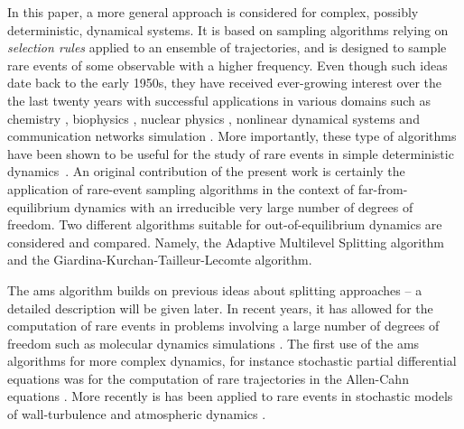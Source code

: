 \documentclass{jfm}
\begin{document}
%
In this paper, a more general approach is considered for complex, possibly deterministic, dynamical systems.
It is based on sampling algorithms relying on \emph{selection rules} applied to an ensemble of trajectories, and is designed to sample rare events of some observable with a higher frequency.
%    
%
Even though such ideas date back to the early 1950s, they have received ever-growing interest over the the last twenty years with successful applications in various domains such as chemistry \citep{van_erp_elaborating_2005,escobedo_transition_2009,teo_adaptive_2016}, biophysics \citep{huber_weighted-ensemble_1996,zuckerman2017weighted,bolhuis2005kinetic}, nuclear physics \citep{louvin2017}, nonlinear dynamical systems \citep{tailleur_probing_2007} and communication networks simulation \citep{villen-altamirano_restart:_1994}.
More importantly, these type of algorithms have been shown to be useful for the study of rare events in simple deterministic dynamics~\citep{wouters2016rare}.
%
%
An original contribution of the present work is certainly the application of rare-event sampling algorithms in the context of far-from-equilibrium dynamics with an irreducible very large number of degrees of freedom. 
% 
Two different algorithms suitable for out-of-equilibrium dynamics are considered and compared. Namely, the Adaptive Multilevel Splitting algorithm and the Giardina-Kurchan-Tailleur-Lecomte algorithm.
%
	
The \acl{ams} algorithm \citep{cerou_adaptive_2007} builds on previous ideas about splitting approaches \citep{KahnHarris1951,glasserman_look_1998,glasserman_multilevel_1999} -- a detailed description will be given later.  
In recent years, it has allowed for the computation of rare events in problems involving a large number of degrees of freedom such as molecular dynamics simulations \citep{aristoff_adaptive_2015,teo_adaptive_2016}. The first use of the \ac{ams} algorithms for more complex dynamics, for instance stochastic partial differential equations was for the computation of rare trajectories in the Allen-Cahn equations \citep{rolland_computing_2016}. More recently is has been applied to rare events in stochastic models of wall-turbulence \citep{rolland_extremely_2018} and atmospheric dynamics \citep{bouchet2019rare}.
\end{document}
